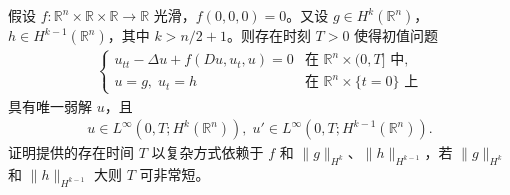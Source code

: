 \documentclass[../../main.tex]{subfiles}
\begin{document}
\begin{theorem}[短时间存在性。]\label{theorem:ch12-短时间存在性}假设 $f:\mathbb{R}^n\times\mathbb{R}\times\mathbb{R}\to\mathbb{R}$ 光滑，$f(0,0,0)=0$。又设 $g\in H^k(\mathbb{R}^n)$，$h\in H^{k-1}(\mathbb{R}^n)$，其中 $k>n/2+1$。则存在时刻 $T>0$ 使得初值问题
\begin{align}
\begin{cases}
u_{tt}-\Delta u+f(Du,u_t,u)=0 & \text{在 } \mathbb{R}^n\times(0,T] \text{ 中},\\
u=g,\;u_t=h & \text{在 } \mathbb{R}^n\times\{t=0\} \text{ 上}
\end{cases}
\label{align:ch12-短时间初值}
\end{align}
具有唯一弱解 $u$，且
\begin{align*}
u\in L^\infty(0,T;H^k(\mathbb{R}^n)),\;u'\in L^\infty(0,T;H^{k-1}(\mathbb{R}^n)).
\end{align*}
证明提供的存在时间 $T$ 以复杂方式依赖于 $f$ 和 $\|g\|_{H^k}$、$\|h\|_{H^{k-1}}$，若 $\|g\|_{H^k}$ 和 $\|h\|_{H^{k-1}}$ 大则 $T$ 可非常短。
\end{theorem}
\end{document}
